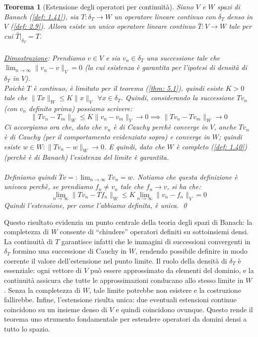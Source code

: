 \documentclass[a4paper,12pt]{report}
\newtheorem{teorema}{Teorema}[chapter]
\newcommand{\gt}{>}
\begin{document}
\begin{teorema}[Estensione degli operatori per continuità]
    Siano $V$ e $W$ spazi di Banach (\ref{def: 1.41}), sia $T: \delta_T\to W$ un operatore lineare continuo con $\delta_T$ denso  in $V$ (\ref{def: 2.9}). Allora esiste un unico operatore lineare continuo $\bar{T}:V\to W$ tale per cui $\bar{T}|_{\delta_T}=T$.
    \\
    \\ \underline{Dimostrazione}: Prendiamo $v\in V$ e sia $v_n\in \delta_T$ una successione tale che \mbox{$\displaystyle\lim_{n\to\infty}\|v_n-v\|_V=0$} (la cui esistenza è garantita per l'ipotesi di densità di $\delta_T$ in $V$).
    \\Poichè $T$ è continuo, è limitato per il teorema (\ref{thm: 5.1}), quindi esiste $K\gt 0 $ tale che $ \|Tx\|_W\leq K \|x\|_V \ \ \forall x\in \delta_T$. Quindi, considerando la successione $Tv_n$ (con $v_n$ definito prima) possiamo scrivere: 
    \[\|Tv_n-T_m\|_W\leq K \|v_n-v_m\|_V\to 0\implies\|Tv_n-Tv_m\|_W\to 0\]
    Ci accorgiamo ora che, dato che $v_n$ è di Cauchy perchè converge in $V$, anche $Tv_n$ è di Cauchy (per il comportamento evidenziato sopra) e converge in $W$; quindi esiste $w\in W: \|Tv_n-w\|_W\to 0$. E quindi, dato che $W$ è completo (\ref{def: 1.40}) (perchè è di Banach) l'esistenza del limite è garantita.
    \\
    \\Definiamo quindi $\bar{T}v=:\displaystyle\lim_{n\to\infty}Tv_n=w$. Notiamo che questa definizione è univoca perchè, se prendiamo $f_n\neq v_n$ tale che $f_n\to v$, si ha che:
    \[\displaystyle\lim_{n\to\infty}\|Tv_n-Tf_n\|_W\leq K\lim_{n\to\infty}\|v_n-f_n\|_V=0\]
    Quindi l'estensione, per come l'abbiamo definita, è unica. \qed
\end{teorema}

Questo risultato evidenzia un punto centrale della teoria degli spazi di Banach: la completezza di $W$ consente di “chiudere” operatori definiti su sottoinsiemi densi. La continuità di $T$ garantisce infatti che le immagini di successioni convergenti in $\delta_T$ formino una successione di Cauchy in $W$, rendendo possibile definire in modo coerente il valore dell’estensione nel punto limite.
Il ruolo della densità di $\delta_T$ è essenziale: ogni vettore di $V$ può essere approssimato da elementi del dominio, e la continuità assicura che tutte le approssimazioni conducano allo stesso limite in $W$. Senza la completezza di $W$, tale limite potrebbe non esistere e la costruzione fallirebbe. Infine, l’estensione risulta unica: due eventuali estensioni continue coincidono su un insieme denso di $V$ e quindi coincidono ovunque. Questo rende il teorema uno strumento fondamentale per estendere operatori da domini densi a tutto lo spazio.
\end{document}
